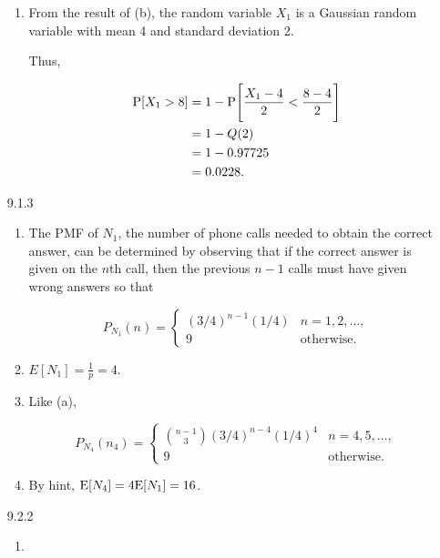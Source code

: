 \documentclass{article}
\begin{document}
\begin{enumerate}
\begin{enumerate}[label=(\alph*)]
        \item From the result of (b), the random variable $X_1$ is a Gaussian random variable with mean 4 and standard deviation 2.

        Thus,

        \begin{align*}
        \text P[X_1 > 8] 
            & = 1 - \text P \Bigg[ \frac{X_1 - 4}{2} < \frac{8 - 4}{2} \Bigg] \\
            & = 1 - Q(2) \\
            & = 1 - 0.97725 \\
            & = 0.0228.
        \end{align*}
    \end{enumerate}

    \item [9.1.3]

    \begin{enumerate}[label=(\alph*)]
        \item
        The PMF of $N_1$, the number of phone calls needed to obtain the correct answer, can be determined by observing that if the correct answer is given on the $n$th call, then the previous $n - 1$ calls must have given wrong answers so that

        $$
        P_{N_1}(n) = \begin{cases}
            (3 / 4)^{n - 1}(1 / 4) & n = 1, 2, \dots, \\
            9                      & \text{otherwise}.
        \end{cases}
        $$

        \item $E[N_1] = \frac{1}{p} = 4$.
        \item Like (a),

        $$
        P_{N_4}(n_4) = \begin{cases}
            \binom{n - 1}{3}(3 / 4)^{n - 4}(1 / 4)^4 & n = 4, 5, \dots, \\
            9                      & \text{otherwise}.
        \end{cases}
        $$

        \item By hint, $\text E[N_4] = 4 \text E[N_1] = 16$.

    \end{enumerate}

    \item [9.2.2]

    \begin{enumerate}[label=(\alph*)]
        \item


\end{enumerate}
\end{enumerate}
\end{document}
